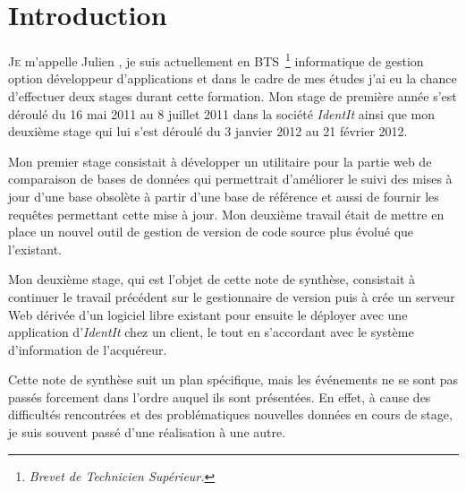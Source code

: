 \chapter{Introduction} %
\label{cha:Introduction}

\lettrine{J}{e} m'appelle Julien , je suis actuellement en
BTS\, \footnote{\emph{Brevet de Technicien Supérieur.}} informatique de
gestion option développeur d'applications et dans le cadre de mes études
j'ai eu la chance d'effectuer deux stages durant cette formation. Mon
stage de première année s'est déroulé du 16 mai 2011 au 8 juillet 2011
dans la société \emph{IdentIt} ainsi que mon deuxième stage qui lui
s'est déroulé du 3 janvier 2012 au 21 février 2012.

Mon premier stage consistait à développer un utilitaire pour la partie
web de comparaison de bases de données qui permettrait d'améliorer le
suivi des mises à jour d'une base obsolète à partir d'une base de
référence et aussi de fournir les requêtes permettant cette mise à jour.
Mon deuxième travail était de mettre en place un nouvel outil de gestion
de version de code source plus évolué que l'existant.

Mon deuxième stage, qui est l'objet de cette note de synthèse,
consistait à continuer le travail précédent sur le gestionnaire de
version puis à crée un serveur Web dérivée d'un logiciel libre existant
pour ensuite le déployer avec une application d'\emph{IdentIt} chez un
client, le tout en s'accordant avec le système d'information de
l'acquéreur.

Cette note de synthèse suit un plan spécifique, mais les événements ne
se sont pas passés forcement dans l'ordre auquel ils sont présentées. En
effet, à cause des difficultés rencontrées et des problématiques
nouvelles données en cours de stage, je suis souvent passé d'une
réalisation à une autre.
